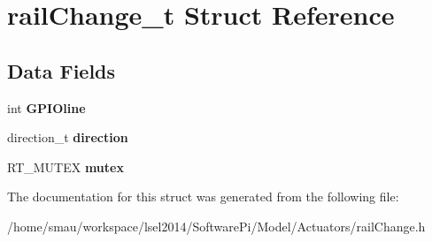 \hypertarget{structrailChange__t}{\section{rail\-Change\-\_\-t Struct Reference}
\label{structrailChange__t}
}
\subsection*{Data Fields}
\begin{DoxyCompactItemize}
\item 
\hypertarget{structrailChange__t_a97fd1ca014dd9792f45187f5818a6604}{int {\bfseries G\-P\-I\-Oline}}\label{structrailChange__t_a97fd1ca014dd9792f45187f5818a6604}

\item 
\hypertarget{structrailChange__t_af87ae07d5b454182034c7d3e9167db6f}{direction\-\_\-t {\bfseries direction}}\label{structrailChange__t_af87ae07d5b454182034c7d3e9167db6f}

\item 
\hypertarget{structrailChange__t_a3bce66390d745c7e98dc73c2a046eedd}{R\-T\-\_\-\-M\-U\-T\-E\-X {\bfseries mutex}}\label{structrailChange__t_a3bce66390d745c7e98dc73c2a046eedd}

\end{DoxyCompactItemize}


The documentation for this struct was generated from the following file\-:\begin{DoxyCompactItemize}
\item 
/home/smau/workspace/lsel2014/\-Software\-Pi/\-Model/\-Actuators/rail\-Change.\-h\end{DoxyCompactItemize}
